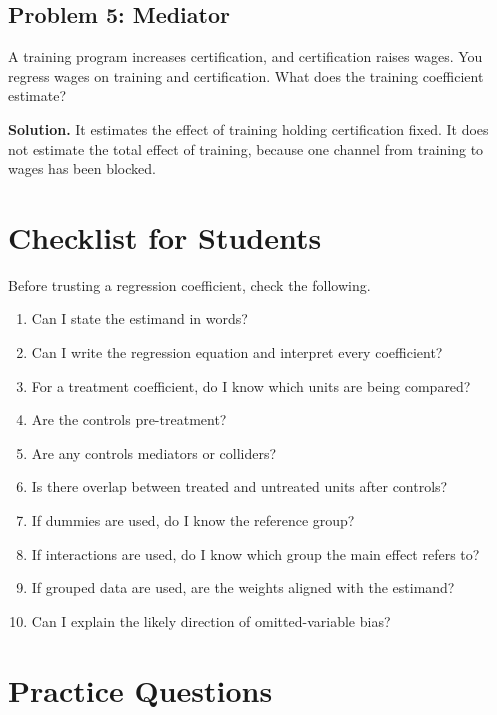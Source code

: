 \subsection{Problem 5: Mediator}

A training program increases certification, and certification raises wages.
You regress wages on training and certification. What does the training
coefficient estimate?

\textbf{Solution.} It estimates the effect of training holding certification
fixed. It does not estimate the total effect of training, because one channel
from training to wages has been blocked.

\section{Checklist for Students}

Before trusting a regression coefficient, check the following.

\begin{enumerate}
\item Can I state the estimand in words?
\item Can I write the regression equation and interpret every coefficient?
\item For a treatment coefficient, do I know which units are being compared?
\item Are the controls pre-treatment?
\item Are any controls mediators or colliders?
\item Is there overlap between treated and untreated units after controls?
\item If dummies are used, do I know the reference group?
\item If interactions are used, do I know which group the main effect refers
to?
\item If grouped data are used, are the weights aligned with the estimand?
\item Can I explain the likely direction of omitted-variable bias?
\end{enumerate}

\section{Practice Questions}

